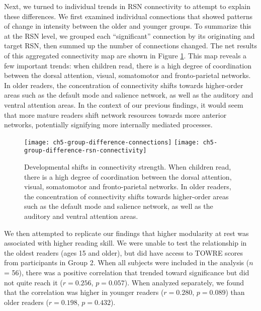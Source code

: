 Next, we turned to individual trends in RSN connectivity to attempt to explain these differences. We first examined individual connections that showed patterns of change in intensity between the older and younger groups. To summarize this at the RSN level, we grouped each ``significant'' connection by its originating and target RSN, then summed up the number of connections changed. The net results of this aggregated connectivity map are shown in Figure \ref{fig:ch5-group-difference-rsn-connectivity}. This map reveals a few important trends: when children read, there is a high degree of coordination between the dorsal attention, visual, somatomotor and fronto-parietal networks. In older readers, the concentration of connectivity shifts towards higher-order areas such as the default mode and salience network, as well as the auditory and ventral attention areas.  In the context of our previous findings, it would seem that more mature readers shift network resources towards more anterior networks, potentially signifying more internally mediated processes.

\begin{figure}[t!]
	\centering
	\texttt{[image: ch5-group-difference-connections]}
	\texttt{[image: ch5-group-difference-rsn-connectivity]}
    \caption[Developmental shifts in connectivity strength.]{Developmental shifts in connectivity strength. When children read, there is a high degree of coordination between the dorsal attention, visual, somatomotor and fronto-parietal networks. In older readers, the concentration of connectivity shifts towards higher-order areas such as the default mode and salience network, as well as the auditory and ventral attention areas.  }
	\label{fig:ch5-group-difference-rsn-connectivity}
\end{figure}

We then attempted to replicate our findings that higher modularity at rest was associated with higher reading skill. We were unable to test the relationship in the oldest readers (ages 15 and older), but did have access to TOWRE scores from participants in Group 2. When all subjects were included in the analysis ($n$ = 56), there was a positive correlation that trended toward significance but did not quite reach it ($r = 0.256$, $p = 0.057$). When analyzed separately, we found that the correlation was higher in younger readers ($r=0.280$, $p=0.089$) than older readers ($r=0.198$, $p=0.432$). 

